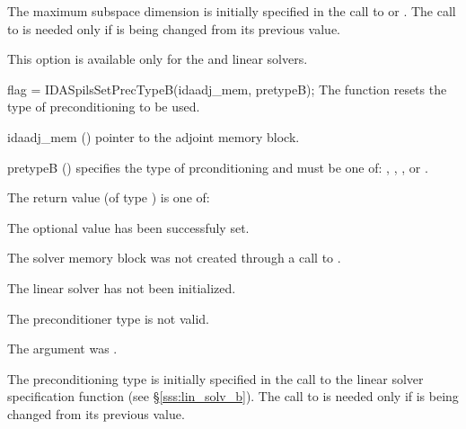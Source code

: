 {
  The maximum subspace dimension is initially specified in the call
  to  or .
  The call to  is needed only if  is being changed from its 
  previous value.

  {\warn}This option is available only for the {\idaspbcg} and {\idasptfqmr} linear solvers.

}
{
  flag = IDASpilsSetPrecTypeB(idaadj\_mem, pretypeB);
}
{
  The function  resets the type
  of preconditioning to be used.
}
{
  \begin{args}
  \item[idaadj\_mem] ()
    pointer to the adjoint memory block.
  \item[pretypeB] ()
    specifies the type of prconditioning and must be one of:
    , , , or .
  \end{args}
}
{
  The return value  (of type ) is one of:
  \begin{args}
  \item[\Id{IDASPILS\_SUCCESS}] 
    The optional value has been successfuly set.
  \item[\Id{IDASPILS\_MEM\_NULL}]
    The {\idas} solver memory block was not created through a call to .
  \item[\Id{IDASPILS\_LMEM\_NULL}]
    The {\idaspgmr} linear solver has not been initialized.
  \item[\Id{IDASPILS\_ILL\_INPUT}]
    The preconditioner type  is not valid.
  \item[\Id{IDASPILS\_ADJMEM\_NULL}]
    The  argument was .
  \end{args}
}
{
  The preconditioning type is initially specified in the call
  to the linear solver specification function (see \S\ref{sss:lin_solv_b}). 
  The call to  is needed only if  is being changed from its 
  previous value.
}

